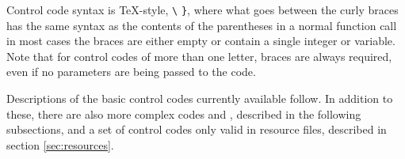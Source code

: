 
    Control code syntax is \TeX-style, \lstinline|\|%
    \rawlbrace\lstinline|}|, where what goes between the curly braces has the
    same syntax as the contents of the parentheses in a normal function
    call\,\textemdash\,in most cases the braces are either empty or contain a
    single integer or variable.  Note that for control codes of more than one
    letter, braces are always required, even if no parameters are being passed
    to the code.

    Descriptions of the basic control codes currently available follow.  In
    addition to these, there are also more complex codes  and
    , described in the following subsections, and a set of control
    codes only valid in resource files, described in section
    \ref{sec:resources}.

